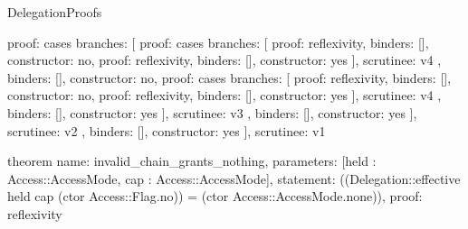 \begin{lexlean}{DelegationProofs}
\begin{semanticmodule}
{{{{          {proof: cases{
            branches: [
              {proof: cases{
                branches: [
                  {proof: reflexivity{}, binders: [], constructor: no},
                  {proof: reflexivity{}, binders: [], constructor: yes}
                ],
                scrutinee: v4
              }, binders: [], constructor: no},
              {proof: cases{
                branches: [
                  {proof: reflexivity{}, binders: [], constructor: no},
                  {proof: reflexivity{}, binders: [], constructor: yes}
                ],
                scrutinee: v4
              }, binders: [], constructor: yes}
            ],
            scrutinee: v3
          }, binders: [], constructor: yes}
        ],
        scrutinee: v2
      }, binders: [], constructor: yes}
    ],
    scrutinee: v1
  }
}

theorem{
  name: invalid_chain_grants_nothing,
  parameters: [held : Access::AccessMode, cap : Access::AccessMode],
  statement: ((Delegation::effective held cap (ctor Access::Flag.no)) = (ctor Access::AccessMode.none)),
  proof: reflexivity{}
}


\end{semanticmodule}
\end{lexlean}
